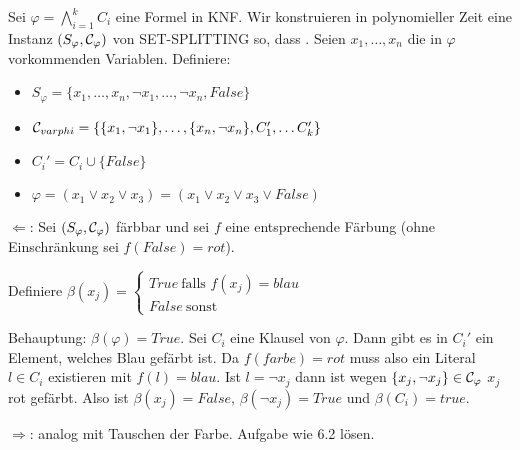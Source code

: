     Sei $\varphi = \bigwedge\limits_{i=1}^{k} C_{i}$ eine Formel in KNF. Wir konstruieren in polynomieller Zeit eine Instanz $(S_{\varphi}, \mathcal{C}_{\varphi})$ von SET-SPLITTING so, dass .
    Seien $x_{1}, \dots, x_{n}$ die in $\varphi$ vorkommenden Variablen. Definiere:
    \begin{itemize}
        \item $S_{\varphi} = \{ x_{1}, \dots, x_{n}, \neg x_{1}, \dots, \neg x_{n}, False \}$
        \item $\mathcal{C}_{varphi} = \{ \{ x_{1}, \neg x_{1} \}, \dots, \{ x_{n}, \neg x_{n} \}, C_{1}', \dots C_{k}' \}$
        \item $C_{i}' = C_{i} \cup \{ False \}$
        \item $\varphi = (x_{1} \lor x_{2} \lor x_{3}) = (x_{1} \lor x_{2} \lor x_{3} \lor False)$
    \end{itemize}

    $\Leftarrow$: Sei $(S_{\varphi}, \mathcal{C}_{\varphi})$ färbbar und sei $f$ eine entsprechende Färbung (ohne Einschränkung sei $f(False) = rot$).

    Definiere $\beta(x_{j}) =
    \begin{cases}
        True\ \text{falls $f(x_{j}) = blau$} \\
        False\ \text{sonst}
    \end{cases}$

    Behauptung: $\beta(\varphi) = True$. Sei $C_{i}$ eine Klausel von $\varphi$. Dann gibt es in $C_{i}'$ ein Element, welches Blau gefärbt ist. Da $f(farbe) = rot$ muss also ein Literal $l \in C_{i}$ existieren mit $f(l) = blau$. Ist $l = \neg x_{j}$ dann ist wegen $\{ x_{j}, \neg x_{j} \} \in \mathcal{C}_{\varphi}$ $x_{j}$ rot gefärbt.
    Also ist $\beta(x_{j}) = False$, $\beta(\neg x_{j}) = True$ und $\beta(C_{i}) = true$. %

    $\Rightarrow$: analog mit Tauschen der Farbe. Aufgabe wie 6.2 lösen.
